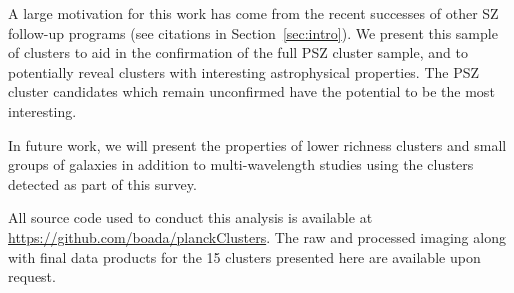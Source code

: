 \documentclass[apj, revtex4-1]{emulateapj}
\begin{document}
A large motivation for this work has come from the recent successes of other SZ follow-up programs (see citations in Section~\ref{sec:intro}). We present this sample of clusters to aid in the confirmation of the full PSZ cluster sample, and to potentially reveal clusters with interesting astrophysical properties. The PSZ cluster candidates which remain unconfirmed have the potential to be the most interesting.

In future work, we will present the properties of lower richness clusters and small groups of galaxies in addition to multi-wavelength studies using the clusters detected as part of this survey.

All source code used to conduct this analysis is available at \url{https://github.com/boada/planckClusters}. The raw and processed imaging along with final data products for the 15 clusters presented here are available upon request.
\end{document}
